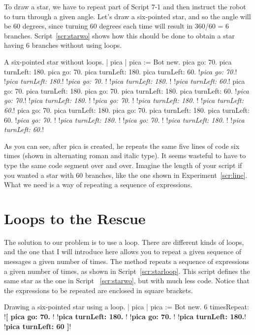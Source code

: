 \documentclass[a4paper,10pt,twoside]{book}
\begin{document}
To draw a star, we have to repeat part of Script 7-1 and then instruct the robot to turn 
through a given angle. Let’s draw a six-pointed star, and so the angle will be 60 degrees, since turning 60 degrees each time will result in 360/60 = 6 branches. Script~\ref{scr:starwo}  shows how this should be done to obtain a star having 6 branches without using loops. 

\begin{script}[starwo]{A six-pointed star without loops.}
	| pica | 
	pica := Bot new. 
	pica go: 70. 
	pica turnLeft: 180. 
	pica go: 70. 
	pica turnLeft: 180. 
	pica turnLeft: 60. 
	!\textit{pica go: 70.}!
	!\textit{pica turnLeft: 180.}! 
	!\textit{pica go: 70. }!
	!\textit{pica turnLeft: 180. }!
	!\textit{pica turnLeft: 60.}!
	pica go: 70. 
	pica turnLeft: 180. 
	pica go: 70. 
	pica turnLeft: 180. 
	pica turnLeft: 60. 
	!\textit{pica go: 70.}!
	!\textit{pica turnLeft: 180. }!
	!\textit{pica go: 70. }!
	!\textit{pica turnLeft: 180. }!
	!\textit{pica turnLeft: 60.}!
	pica go: 70. 
	pica turnLeft: 180. 
	pica go: 70. 
	pica turnLeft: 180. 
	pica turnLeft: 60. 
	!\textit{pica go: 70. }!
	!\textit{pica turnLeft: 180. }!
	!\textit{pica go: 70. }!
	!\textit{pica turnLeft: 180. }!
	!\textit{pica turnLeft: 60.}!
\end{script}

As you can see, after pica is created, he repeats the same five lines of code six times (shown 
in alternating roman and italic type). It seems wasteful to have to type the same code segment 
over and over. Imagine the length of your script if you wanted a star with 60 branches, like the one shown in Experiment~\ref{scr:line}. What we need is a way of repeating a sequence of expressions. 

\section{Loops to the Rescue}

The solution to our problem is to use a loop. There are different kinds of loops, and the one 
that I will introduce here allows you to repeat a given sequence of messages a given number of 
times. The method  repeats a sequence of expressions a given number of times, 
as shown in Script~\ref{scr:starloop}. This script defines the same star as the one in Script ~\ref{scr:starwo}, but with much less code. Notice that the expressions to be repeated are enclosed in square brackets. 

\begin{script}[starloop]{Drawing a six-pointed star using a loop.}
	| pica | 
	pica := Bot new. 
	6 timesRepeat: 
		!\textbf{[ pica go: 70. }!
		!\textbf{pica turnLeft: 180. }!
		!\textbf{pica go: 70. }!
		!\textbf{pica turnLeft: 180.}!
		!\textbf{pica turnLeft: 60 ]}!
\end{script}
\end{document}
